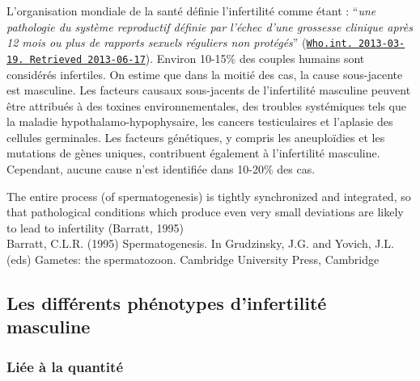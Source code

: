 \documentclass[12pt,twoside]{reedthesis}
\theoremstyle{definition}
\theoremstyle{definition}
\theoremstyle{remark}
\begin{document}
  L'organisation mondiale de la santé définie l'infertilité comme étant :
  ``\emph{une pathologie du système reproductif définie par l'échec d'une
  grossesse clinique après 12 mois ou plus de rapports sexuels réguliers
  non protégés}''
  (\href{http://www.who.int/reproductivehealth/topics/infertility/definitions/en/}{\texttt{Who.int.\ 2013-03-19.\ Retrieved\ 2013-06-17}}).
  Environ 10-15\% des couples humains sont considérés infertiles. On
  estime que dans la moitié des cas, la cause sous-jacente est masculine.
  Les facteurs causaux sous-jacents de l'infertilité masculine peuvent
  être attribués à des toxines environnementales, des troubles systémiques
  tels que la maladie hypothalamo-hypophysaire, les cancers testiculaires
  et l'aplasie des cellules germinales. Les facteurs génétiques, y compris
  les aneuploïdies et les mutations de gènes uniques, contribuent
  également à l'infertilité masculine. Cependant, aucune cause n'est
  identifiée dans 10-20\% des cas.
  
  The entire process (of spermatogenesis) is tightly synchronized and
  integrated, so that pathological conditions which produce even very
  small deviations are likely to lead to infertility (Barratt, 1995)\\
  Barratt, C.L.R. (1995) Spermatogenesis. In Grudzinsky, J.G. and Yovich,
  J.L. (eds) Gametes: the spermatozoon. Cambridge University Press,
  Cambridge
  
  \subsection{Les différents phénotypes d'infertilité
  masculine}\label{les-differents-phenotypes-dinfertilite-masculine}
  
  \subsubsection{Liée à la quantité}\label{liee-a-la-quantite}
  
\end{document}
